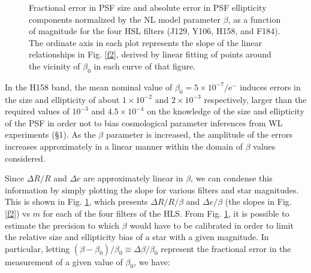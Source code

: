 \documentclass[preprint]{aastex}
\begin{document}
\begin{figure}[!h]
\centering
{}
\caption{Fractional error in PSF size and absolute error in PSF ellipticity components normalized by the NL model parameter $\beta$, as a function of magnitude for the four HSL filters (J129, Y106, H158, and F184). The ordinate axis in each plot represents the slope of the linear relationships in Fig. \ref{f2}, derived by linear fitting of points around the vicinity of $\beta_0$ in each curve of that figure.}
\label{f3}
\end{figure}

In the H158 band, the mean nominal value of $\beta_0=5\times10^{-7}/\mathrm{e^-}$ induces errors in the size and ellipticity of about $1\times10^{-2}$ and $2\times10^{-3}$ respectively, larger than the required values of $10^{-3}$ and $4.5\times10^{-4}$ on the knowledge of the size and ellipticity of the PSF in order not to bias cosmological parameter inferences from WL experiments (\S1). As the $\beta$ parameter is increased, the amplitude of the errors increases approximately in a linear manner within the domain of $\beta$ values considered. 
 
Since $\Delta R/R$ and $\Delta e$ are approximately linear in $\beta$, we can condense this information by simply plotting the slope for various filters and star magnitudes. This is shown in Fig. \ref{f3}, which presents $\Delta R/R/\beta$ and $\Delta e/\beta$ (the slopes in Fig. \ref{f2}) vs $m$ for each of the four filters of the HLS. From Fig. \ref{f3}, it is possible to estimate the precision to which $\beta$ would have to be calibrated in order to limit the relative size and ellipticity bias of a star with a given magnitude. In particular, letting $(\beta - \beta_0)/\beta_0 \equiv \Delta \beta / \beta_0$ represent the fractional error in the measurement of a given value of $\beta_0$, we have: 
\end{document}
